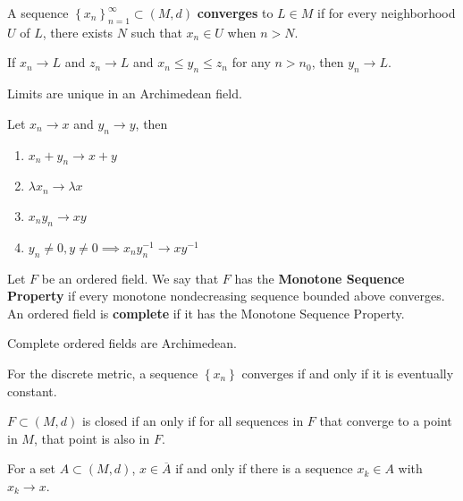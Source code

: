 \documentclass[10pt]{report}
\begin{document}
\begin{defn}[]
	A sequence $\left\{ x_n \right\}_{n=1}^\infty \subset (M,d)$ \textbf{converges} to $L \in M$ if for every neighborhood $U$ of $L$, there exists $N$ such that $x_n \in U$ when $n > N$.
\end{defn}


\begin{prop}
	If $x_n \to L$ and $z_n \to L$ and $x_n \leq y_n \leq z_n$ for any $n > n_0$, then $y_n \to L$.
\end{prop}

\begin{prop}
	Limits are unique in an Archimedean field.
\end{prop}

\begin{thrm}
Let $x_n \to x$ and $y_n \to y$, then
\begin{enumerate}
	\item $x_n + y_n \to x+y$
	\item $\lambda x_n \to \lambda x$
	\item $x_n y_n \to xy$ 
	\item $y_n \neq 0, y \neq 0 \implies x_n y_n^{-1} \to xy^{-1}$
\end{enumerate}
\end{thrm}

\begin{defn}
	Let $F$ be an ordered field. We say that $F$ has the \textbf{Monotone Sequence Property} if every monotone nondecreasing sequence bounded above converges. An ordered field is \textbf{complete} if it has the Monotone Sequence Property.
\end{defn}

Complete ordered fields are Archimedean.

\begin{ex}[]
	For the discrete metric, a sequence $\left\{ x_n \right\}$ converges if and only if it is eventually constant.
\end{ex}

\begin{prop}
	$F\subset (M,d)$ is closed if an only if for all sequences in $F$ that converge to a point in $M$, that point is also in $F$.
\end{prop}

\begin{prop}
	For a set $A \subset (M,d)$, $x \in \overline{A}$ if and only if there is a sequence $x_k \in A$ with $x_k \to x$.
\end{prop}
\end{document}
